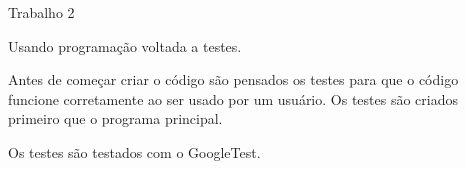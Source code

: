 Trabalho 2

Usando programação voltada a testes.

Antes de começar criar o código são pensados os testes para que o código funcione corretamente ao ser usado por um usuário. Os testes são criados primeiro que o programa principal.

Os testes são testados com o Google\+Test. 